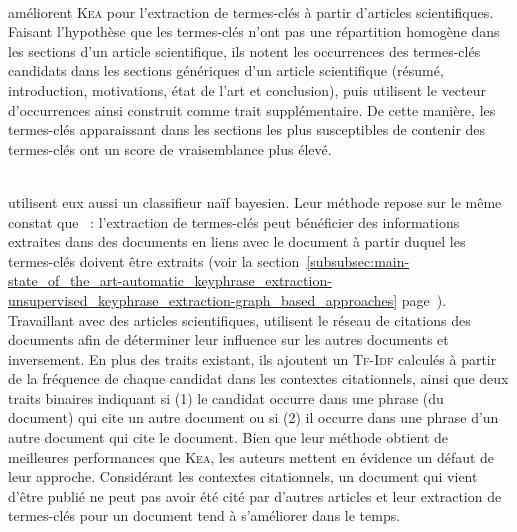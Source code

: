         ~\\ améliorent \textsc{Kea} pour
        l'extraction de termes-clés à partir d'articles scientifiques. Faisant
        l'hypothèse que les termes-clés n'ont pas une répartition homogène dans
        les sections d'un article scientifique, ils notent les occurrences des
        termes-clés candidats dans les sections génériques d'un article
        scientifique (résumé, introduction, motivations, état de l'art et
        conclusion), puis utilisent le vecteur d'occurrences ainsi construit
        comme trait supplémentaire. De cette manière, les termes-clés
        apparaissant dans les sections les plus susceptibles de contenir des
        termes-clés ont un score de vraisemblance plus élevé.
        
        ~\\ utilisent
        eux aussi un classifieur naïf bayesien. Leur méthode repose sur le même
        constat que ~: l'extraction de termes-clés
        peut bénéficier des informations extraites dans des documents en liens
        avec le document à partir duquel les termes-clés doivent être extraits
        (voir la
        section~\ref{subsubsec:main-state_of_the_art-automatic_keyphrase_extraction-unsupervised_keyphrase_extraction-graph_based_approaches}
        page~\pageref{subsubsec:main-state_of_the_art-automatic_keyphrase_extraction-unsupervised_keyphrase_extraction-graph_based_approaches}).
        Travaillant avec des articles scientifiques,
         utilisent le
        réseau de citations des documents afin de déterminer leur influence sur
        les autres documents et inversement. En plus des traits existant, ils
        ajoutent un \textsc{Tf-Idf} calculés à partir de la fréquence de chaque
        candidat dans les contextes citationnels, ainsi que deux traits binaires
        indiquant si (1) le candidat occurre dans une phrase (du document) qui cite
        un autre document ou si (2) il occurre dans une phrase d'un autre document
        qui cite le document. Bien que leur méthode obtient de meilleures
        performances que \textsc{Kea}, les auteurs mettent en évidence un défaut
        de leur approche. Considérant les contextes citationnels, un document
        qui vient d'être publié ne peut pas avoir été cité par d'autres articles
        et leur extraction de termes-clés pour un document tend à s'améliorer
        dans le temps.

